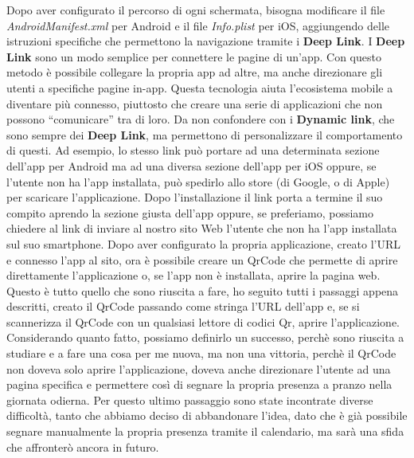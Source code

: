 \newline
Dopo aver configurato il percorso di ogni schermata, bisogna modificare il file \emph{AndroidManifest.xml} per Android e il file \emph{Info.plist} per iOS, aggiungendo delle istruzioni specifiche che permettono la navigazione tramite i \textbf{Deep Link}.\newline
\newline
I \textbf{Deep Link} sono un modo semplice per connettere le pagine di un'app.\newline
Con questo metodo è possibile collegare la propria app ad altre, ma anche direzionare gli utenti a specifiche pagine in-app.\newline
Questa tecnologia aiuta l’ecosistema mobile a diventare più connesso, piuttosto che creare una serie di applicazioni che non possono “comunicare” tra di loro.\newline
Da non confondere con i \textbf{Dynamic link}, che sono sempre dei \textbf{Deep Link}, ma permettono di personalizzare il comportamento di questi.\newline
Ad esempio, lo stesso link può portare ad una determinata sezione dell'app per Android ma ad una diversa sezione dell'app per iOS oppure, se l'utente non ha l'app installata, può spedirlo allo store (di Google, o di Apple) per scaricare l'applicazione.\newline
Dopo l'installazione il link porta a termine il suo compito aprendo la sezione giusta dell'app oppure, se preferiamo, possiamo chiedere al link di inviare al nostro sito Web l'utente che non ha l'app installata sul suo smartphone.\newline
\newline
Dopo aver configurato la propria applicazione, creato l'URL e connesso l'app al sito, ora è possibile creare un QrCode che permette di aprire direttamente l'applicazione o, se l'app non è installata, aprire la pagina web.\newline
Questo è tutto quello che sono riuscita a fare, ho seguito tutti i passaggi appena descritti, creato il QrCode passando come stringa l'URL dell'app e, se si scannerizza il QrCode con un qualsiasi lettore di codici Qr, aprire l'applicazione.\newline
\newline
Considerando quanto fatto, possiamo definirlo un successo, perchè sono riuscita a studiare e a fare una cosa per me nuova, ma non una vittoria, perchè il QrCode non doveva solo aprire l'applicazione, doveva anche direzionare l'utente ad una pagina specifica e permettere così di segnare la propria presenza a pranzo nella giornata odierna.\newline
Per questo ultimo passaggio sono state incontrate diverse difficoltà, tanto che abbiamo deciso di abbandonare l'idea, dato che è già possibile segnare manualmente la propria presenza tramite il calendario, ma sarà una sfida che affronterò ancora in futuro.
